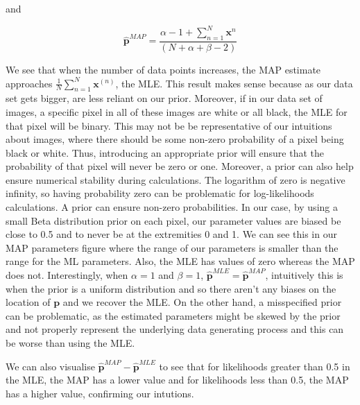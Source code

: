 \documentclass[12pt]{article}
\begin{document}
\begin{enumerate}
    and

    $$\hat{\textbf{p}}^{MAP}  =  \frac{\alpha - 1 +\sum_{n=1}^{N} \textbf{x}^n}{(N+\alpha+\beta-2)}$$


We see that when the number of data points increases, the MAP estimate approaches $\frac{1}{N}\sum_{n=1}^{N} \textbf{x}^{(n)}$, the MLE. This result makes sense because as our data set gets bigger, are less reliant on our prior.  Moreover, if in our data set of images, a specific pixel in all of these images are white or all black, the MLE for that pixel will be binary. This may not be be representative of our intuitions about images, where there should be some non-zero probability of a pixel being black or white. Thus, introducing an appropriate prior will ensure that the probability of that pixel will never be zero or one. Moreover, a prior can also help ensure numerical stability during calculations. The logarithm of zero is negative infinity, so having probability zero can be problematic for log-likelihoods calculations. A prior can ensure non-zero probabilities. In our case, by using a small Beta distribution prior on each pixel, our parameter values are biased be close to 0.5 and to never be at the extremities 0 and 1. We can see this in our MAP parameters figure where the range of our parameters is smaller than the range for the ML parameters. Also, the MLE has values of zero whereas the MAP does not. Interestingly, when $\alpha=1$ and $\beta=1$, $\hat{\textbf{p}}^{MLE} = \hat{\textbf{p}}^{MAP}$, intuitively this is when the prior is a uniform distribution and so there aren't any biases on the location of $\textbf{p}$ and we recover the MLE. On the other hand, a misspecified prior can be problematic, as the estimated parameters might be skewed by the prior and not properly represent the underlying data generating process and this can be worse than using the MLE.

    We can also visualise $\hat{\textbf{p}}^{MAP}-\hat{\textbf{p}}^{MLE}$ to see that for likelihoods greater than 0.5 in the MLE, the MAP has a lower value and for likelihoods less than 0.5, the MAP has a higher value, confirming our intutions.


\end{enumerate}
\end{document}

